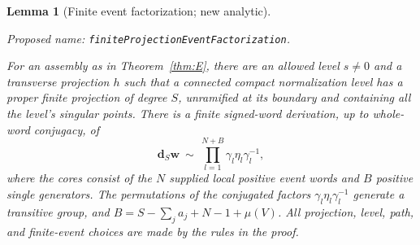 \documentclass[11pt,a4paper]{article}
\newtheorem{lemma}[theorem]{Lemma}
\theoremstyle{remark}
\newcommand{\formalname}[1]{\leavevmode\par\noindent\textnormal{\small Proposed name: \texttt{#1}.}\par\smallskip}
\begin{document}
\begin{lemma}[Finite event factorization; new analytic]
\label{lem:analytic-factorization}
\formalname{finiteProjectionEventFactorization}
For an assembly as in Theorem~\ref{thm:E}, there are an allowed level
$s\ne0$ and a transverse projection $h$ such that a connected compact
normalization level has a proper finite projection of degree $S$,
unramified at its boundary and containing all the level's singular
points.  There is a finite signed-word derivation, up to whole-word
conjugacy, of
\[
 \mathbf d_S\mathbf w\ \sim\
 \prod_{l=1}^{N+B}\gamma_l\eta_l\gamma_l^{-1},
\]
where the cores consist of the $N$ supplied local positive event
words and $B$ positive single generators.  The permutations of the
conjugated factors $\gamma_l\eta_l\gamma_l^{-1}$
generate a transitive group, and
$B=S-\sum_j a_j+N-1+\mu(V)$.  All projection, level, path, and
finite-event choices are made by the rules in the proof.
\end{lemma}
\end{document}
